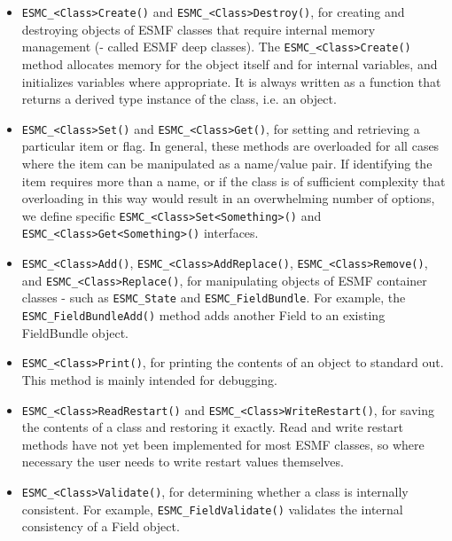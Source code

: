 \begin{itemize}

\item
\begin{sloppypar}
{\tt ESMC\_<Class>Create()} and {\tt ESMC\_<Class>Destroy()}, for
creating and destroying objects of ESMF classes that require internal memory
management (- called ESMF deep classes). The {\tt ESMC\_<Class>Create()} method
allocates memory for the object itself and for internal variables, and
initializes variables where appropriate.  It is always written as a
function that returns a derived type instance of the class, i.e. an object.
\end{sloppypar}

\item 
\begin{sloppypar}
{\tt ESMC\_<Class>Set()} and {\tt ESMC\_<Class>Get()}, for setting and 
retrieving a particular item or flag.  In general, these methods are overloaded
for all cases where the item can be manipulated as a name/value pair.  If
identifying the item requires more than a name, or if the class is of
sufficient complexity that overloading in this way would result in an
overwhelming number of options, we define specific
{\tt ESMC\_<Class>Set<Something>()} and {\tt ESMC\_<Class>Get<Something>()}
interfaces.
\end{sloppypar}

\item {\tt ESMC\_<Class>Add()}, {\tt ESMC\_<Class>AddReplace()},
{\tt ESMC\_<Class>Remove()}, and {\tt ESMC\_<Class>Replace()}, for manipulating
objects of ESMF container classes - such as {\tt ESMC\_State} and
{\tt ESMC\_FieldBundle}. For example, the {\tt ESMC\_FieldBundleAdd()}
method adds another Field to an existing FieldBundle object.

\item {\tt ESMC\_<Class>Print()}, for printing the contents of an object to 
standard out.  This method is mainly intended for debugging.

\item {\tt ESMC\_<Class>ReadRestart()} and {\tt ESMC\_<Class>WriteRestart()}, 
for saving the contents of a class and restoring it exactly.  Read
and write restart methods have not yet been implemented for most
ESMF classes, so where necessary the user needs to write restart 
values themselves.

\item 
\begin{sloppypar}
{\tt ESMC\_<Class>Validate()}, for determining whether a class is 
internally consistent.  For example, {\tt ESMC\_FieldValidate()} validates
the internal consistency of a Field object.
\end{sloppypar}

\end{itemize}

